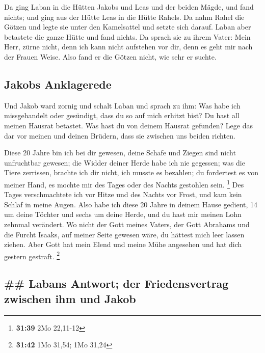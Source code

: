  Da ging Laban in die Hütten Jakobs und Leas und der
beiden Mägde, und fand nichts; und ging aus der Hütte Leas in die Hütte
Rahels.  Da nahm Rahel die Götzen und legte sie unter den
Kamelsattel und setzte sich darauf. Laban aber betastete die ganze Hütte
und fand nichts.  Da sprach sie zu ihrem Vater: Mein
Herr, zürne nicht, denn ich kann nicht aufstehen vor dir, denn es geht
mir nach der Frauen Weise. Also fand er die Götzen nicht, wie sehr er
suchte.

\hypertarget{jakobs-anklagerede}{%
\subsection{Jakobs Anklagerede}\label{jakobs-anklagerede}}

 Und Jakob ward zornig und schalt Laban und sprach zu
ihm: Was habe ich missgehandelt oder gesündigt, dass du so auf mich
erhitzt bist?  Du hast all meinen Hausrat betastet. Was
hast du von deinem Hausrat gefunden? Lege das dar vor meinen und deinen
Brüdern, dass sie zwischen uns beiden richten.

 Diese 20 Jahre bin ich bei dir gewesen, deine Schafe und
Ziegen sind nicht unfruchtbar gewesen; die Widder deiner Herde habe ich
nie gegessen;  was die Tiere zerrissen, brachte ich dir
nicht, ich musste es bezahlen; du fordertest es von meiner Hand, es
mochte mir des Tages oder des Nachts gestohlen sein. \footnote{\textbf{31:39}
  2Mo 22,11-12}  Des Tages verschmachtete ich vor Hitze
und des Nachts vor Frost, und kam kein Schlaf in meine Augen.
 Also habe ich diese 20 Jahre in deinem Hause gedient, 14
um deine Töchter und sechs um deine Herde, und du hast mir meinen Lohn
zehnmal verändert.  Wo nicht der Gott meines Vaters, der
Gott Abrahams und die Furcht Isaaks, auf meiner Seite gewesen wäre, du
hättest mich leer lassen ziehen. Aber Gott hat mein Elend und meine Mühe
angesehen und hat dich gestern gestraft. \footnote{\textbf{31:42} 1Mo
  31,54; 1Mo 31,24}

\hypertarget{labans-antwort-der-friedensvertrag-zwischen-ihm-und-jakob}{%
\subsection{\#\# Labans Antwort; der Friedensvertrag zwischen ihm und
Jakob}\label{labans-antwort-der-friedensvertrag-zwischen-ihm-und-jakob}}

